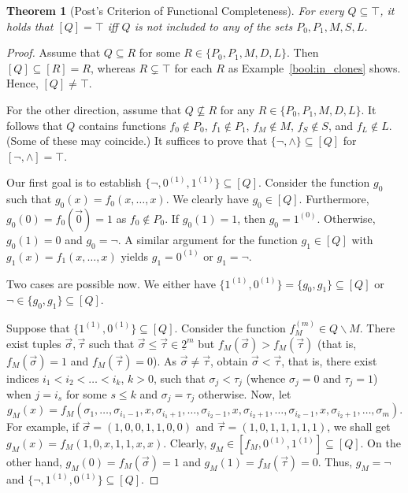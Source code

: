 \documentclass[12pt,notitlepage]{article}
\theoremstyle{plain}
\newtheorem{thm}{Theorem}[section]
\theoremstyle{definition}
\theoremstyle{plain}
\newcommand{\sbs}{\subseteq}
\renewcommand{\setminus}{\smallsetminus}
\newcommand{\ul}[1]{\underline{#1}}
\newcommand{\1}{\mathbf{1}}
\newcommand{\0}{\mathbf{0}}
\begin{document}
\begin{thm}[Post's Criterion of Functional Completeness]\label{bool:post}
For every $Q \sbs \top$, it holds that $[Q] = \top$ iff $Q$ is \emph{not included} to any of the sets $P_0, P_1, M, S, L$.
\end{thm}
\begin{proof}
Assume that $Q \sbs R$ for some $R \in \{P_0, P_1, M, D, L\}$. Then $[Q] \sbs [R] = R$, whereas $R  \subsetneq \top$ for each $R$ as Example~\ref{bool:in_clones} shows. Hence, $[Q] \neq \top$.

For the other direction, assume that $Q \not\sbs R$ for any $R \in \{P_0, P_1, M, D, L\}$. It follows that $Q$ contains functions $f_0 \notin P_0$, $f_1 \notin P_1$, $f_M \notin M$, $f_S \notin S$, and $f_L \notin L$. (Some of these may coincide.) It suffices to prove that $\{{\neg}, {\wedge} \} \sbs [Q]$ for $[{\neg}, {\wedge} ] = \top$.

Our first goal is to establish $\{{\neg}, 0^{(1)}, 1^{(1)} \} \sbs [Q]$. Consider the function $g_0$ such that $g_0(x) = f_{0}(x, \ldots, x)$. We clearly have $g_0 \in [Q]$. Furthermore, $g_0(0) = f_0(\vec 0) = 1$ as $f_0 \notin P_{0}$. If $g_0(1) = 1$, then $g_0 = 1^{(0)}$. Otherwise, $g_0(1) = 0$ and $g_0 = {\neg}$. A similar argument for the function $g_1 \in [Q]$ with $g_1(x) = f_{1}(x, \ldots, x)$ yields $g_1 = 0^{(1)}$ or $g_1 = {\neg}$.

Two cases are possible now. We either have $\{1^{(1)}, 0^{(1)}\} = \{g_0, g_1\} \sbs [Q]$ or ${\neg} \in \{g_0, g_1\} \sbs [Q]$.

Suppose that $\{1^{(1)}, 0^{(1)}\} \sbs [Q]$. Consider the function $f^{(m)}_M \in Q \setminus M$. There exist tuples $\vec\sigma, \vec\tau$ such that $\vec \sigma \leq \vec \tau \in \ul{2}^m$ but $f_M(\vec\sigma) > f_M(\vec\tau)$ (that is, $f_M(\vec \sigma) = 1$ and $f_M(\vec{\tau}) = 0$). As $\vec \sigma \neq \vec \tau$, obtain $\vec \sigma < \vec \tau$, that is, there exist indices $i_1 <  i_2 < \ldots < i_k$, $k > 0$, such that $\sigma_j < \tau_j$ (whence $\sigma_j = 0$ and $\tau_j = 1$) when $j = i_s$ for some $s \leq k$ and $\sigma_j = \tau_j$ otherwise. Now, let
$$g_M(x) = f_M(\sigma_1, \ldots, \sigma_{i_1 - 1}, x, \sigma_{i_1 + 1}, \ldots, \sigma_{i_2 - 1}, x,  \sigma_{i_2 + 1}, \ldots, \sigma_{i_k - 1}, x,  \sigma_{i_2 + 1}, \ldots, \sigma_m).$$
For example, if $\vec\sigma = (1,0,0,1,1,0,0)$ and $\vec\tau = (1,0,1,1,1,1,1)$, we shall get $g_M(x) = f_M(1, 0, x, 1, 1, x, x)$. Clearly, $g_M \in [f_M, 0^{(1)}, 1^{(1)}] \sbs [Q]$. On the other hand, $g_M(0) = f_M(\vec\sigma) = 1$ and $g_M(1) = f_M(\vec{\tau}) = 0$. Thus, $g_M = {\neg}$ and $\{{\neg}, 1^{(1)}, 0^{(1)}\} \sbs [Q]$.


\end{proof}
\end{document}

